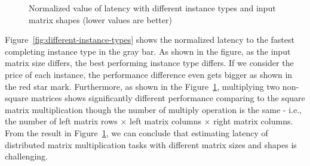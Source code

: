 \documentclass[10pt, conference, compsocconf]{IEEEtran}
\begin{document}
\begin{figure}[t]
  \centering
  \hfil\hfil\hfil\hfil\hfil\hfil\hfil\hfil\hfil\hfil{}
  \caption{\label{fig:instance-blocks-sizes-compare}Normalized value of latency with different instance types and input matrix shapes (lower values are better)}
\end{figure}

Figure~\ref{fig:different-instance-types} shows the normalized latency to the fastest completing instance type in the gray bar. As shown in the figure, as the input matrix size differs, the best performing instance type differs. If we consider the price of each instance, the performance difference even gets bigger as shown in the red star mark. Furthermore, as shown in the Figure~\ref{fig:instance-blocks-sizes-compare}, multiplying two non-square matrices shows significantly different performance comparing to the square matrix multiplication though the number of multiply operation is the same - i.e., the number of left matrix rows $\times$ left matrix columns $\times$ right matrix columns. From the result in Figure~\ref{fig:instance-blocks-sizes-compare}, we can conclude that estimating latency of distributed matrix multiplication tasks with different matrix sizes and shapes is challenging.
\end{document}

